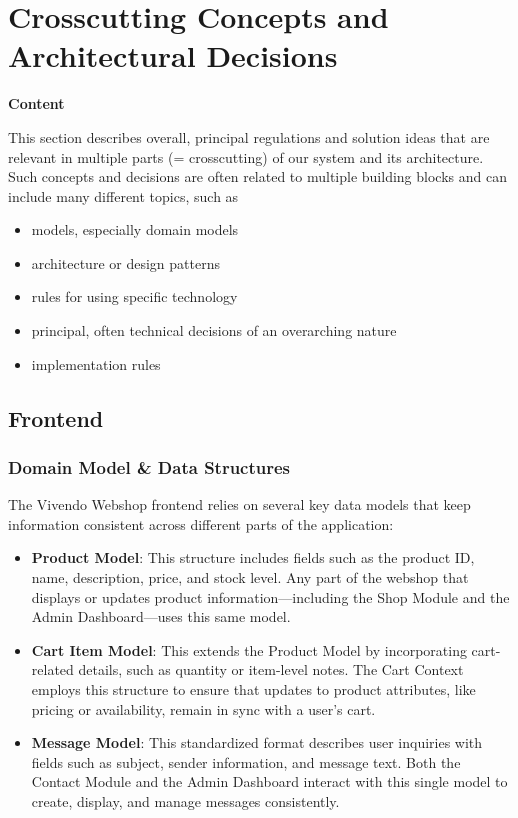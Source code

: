 \hypertarget{section-concepts}{%
\section{Crosscutting Concepts and Architectural Decisions}\label{section-concepts}}

\textbf{Content}

This section describes overall, principal regulations and solution ideas that are relevant in multiple parts (= crosscutting) of our system and its architecture. Such concepts and decisions are often related to multiple building blocks and can include many different topics, such as

\begin{itemize}
  \item
    models, especially domain models
  \item
    architecture or design patterns
  \item
    rules for using specific technology
  \item
    principal, often technical decisions of an overarching nature
  \item
    implementation rules
  \end{itemize}

\subsection{Frontend}

\subsubsection{Domain Model \& Data Structures}
The Vivendo Webshop frontend relies on several key data models that keep information consistent across different parts of the application:

\begin{itemize}
  \item \textbf{Product Model}: This structure includes fields such as the product ID, name, description, price, and stock level. Any part of the webshop that displays or updates product information---including the Shop Module and the Admin Dashboard---uses this same model.
  
  \item \textbf{Cart Item Model}: This extends the Product Model by incorporating cart-related details, such as quantity or item-level notes. The Cart Context employs this structure to ensure that updates to product attributes, like pricing or availability, remain in sync with a user's cart.
  
  \item \textbf{Message Model}: This standardized format describes user inquiries with fields such as subject, sender information, and message text. Both the Contact Module and the Admin Dashboard interact with this single model to create, display, and manage messages consistently.
\end{itemize}

